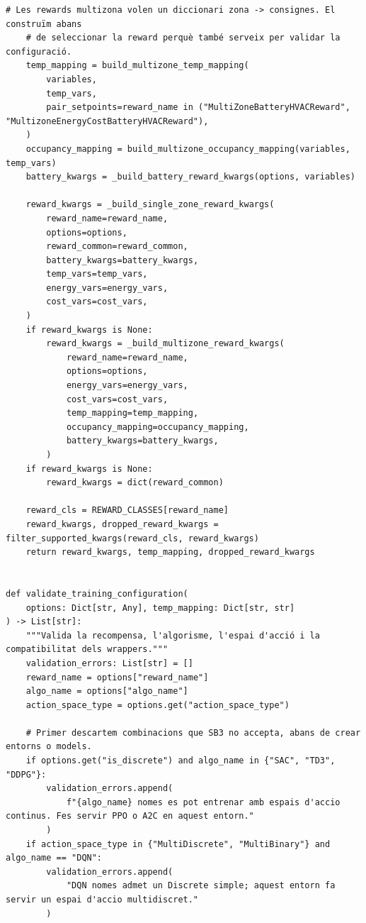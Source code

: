 \documentclass[10pt,a4paper]{article}
\begin{document}
\begin{lstlisting}[style=studioPython,caption={backend/entrenar\_agent\_rewards.py},label={lst:backend-entrenar-agent-rewards-py}]
    # Les rewards multizona volen un diccionari zona -> consignes. El construïm abans
    # de seleccionar la reward perquè també serveix per validar la configuració.
    temp_mapping = build_multizone_temp_mapping(
        variables,
        temp_vars,
        pair_setpoints=reward_name in ("MultiZoneBatteryHVACReward", "MultizoneEnergyCostBatteryHVACReward"),
    )
    occupancy_mapping = build_multizone_occupancy_mapping(variables, temp_vars)
    battery_kwargs = _build_battery_reward_kwargs(options, variables)

    reward_kwargs = _build_single_zone_reward_kwargs(
        reward_name=reward_name,
        options=options,
        reward_common=reward_common,
        battery_kwargs=battery_kwargs,
        temp_vars=temp_vars,
        energy_vars=energy_vars,
        cost_vars=cost_vars,
    )
    if reward_kwargs is None:
        reward_kwargs = _build_multizone_reward_kwargs(
            reward_name=reward_name,
            options=options,
            energy_vars=energy_vars,
            cost_vars=cost_vars,
            temp_mapping=temp_mapping,
            occupancy_mapping=occupancy_mapping,
            battery_kwargs=battery_kwargs,
        )
    if reward_kwargs is None:
        reward_kwargs = dict(reward_common)

    reward_cls = REWARD_CLASSES[reward_name]
    reward_kwargs, dropped_reward_kwargs = filter_supported_kwargs(reward_cls, reward_kwargs)
    return reward_kwargs, temp_mapping, dropped_reward_kwargs


def validate_training_configuration(
    options: Dict[str, Any], temp_mapping: Dict[str, str]
) -> List[str]:
    """Valida la recompensa, l'algorisme, l'espai d'acció i la compatibilitat dels wrappers."""
    validation_errors: List[str] = []
    reward_name = options["reward_name"]
    algo_name = options["algo_name"]
    action_space_type = options.get("action_space_type")

    # Primer descartem combinacions que SB3 no accepta, abans de crear entorns o models.
    if options.get("is_discrete") and algo_name in {"SAC", "TD3", "DDPG"}:
        validation_errors.append(
            f"{algo_name} nomes es pot entrenar amb espais d'accio continus. Fes servir PPO o A2C en aquest entorn."
        )
    if action_space_type in {"MultiDiscrete", "MultiBinary"} and algo_name == "DQN":
        validation_errors.append(
            "DQN nomes admet un Discrete simple; aquest entorn fa servir un espai d'accio multidiscret."
        )


\end{lstlisting}
\end{document}
